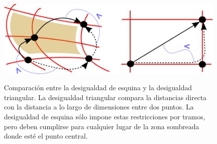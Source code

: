 \documentclass[spanish]{article}
\begin{document}
\begin{figure}
  \centering
  \includegraphics[bb=0 0 374 125]{imagenes/esquina.png}
  \label{fig:esquina}
  \caption{%
    Comparación entre la desigualdad de esquina y la desigualdad
    triangular.  La desigualdad triangular compara la distancias directa con
    la distancia a lo largo de dimensiones entre dos puntos.  La desigualdad de
    esquina sólo impone estas restricciones por tramos, pero deben cumplirse
    para cualquier lugar de la zona sombreada donde esté el punto central.
  }
\end{figure}
\end{document}
